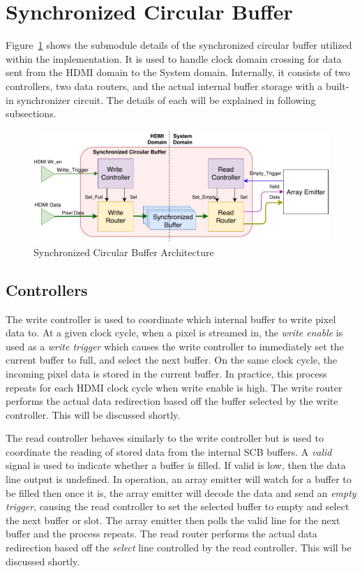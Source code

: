 \section{Synchronized Circular Buffer}

    Figure~\ref{fig:scb_arch} shows the submodule details of the synchronized circular buffer utilized within the implementation. It is used to handle clock domain crossing for data sent from the HDMI domain to the System domain. Internally, it consists of two controllers, two data routers, and the actual internal buffer storage with a built-in synchronizer circuit. The details of each will be explained in following subsections.

    \begin{figure}
        \centering
        \includegraphics[width=1.0\textwidth]{fig/pdp_scb_arch.pdf}
        \caption{Synchronized Circular Buffer Architecture}
        \label{fig:scb_arch}
    \end{figure}

    \subsection{Controllers}
        The write controller is used to coordinate which internal buffer to write pixel data to. At a given clock cycle, when a pixel is streamed in, the {\it write enable} is used as a {\it write trigger} which causes the write controller to immediately set the current buffer to full, and select the next buffer. On the same clock cycle, the incoming pixel data is stored in the current buffer. In practice, this process repeats for each HDMI clock cycle when write enable is high. The write router performs the actual data redirection based off the buffer selected by the write controller. This will be discussed shortly.

        The read controller behaves similarly to the write controller but is used to coordinate the reading of stored data from the internal SCB buffers. A {\it valid} signal is used to indicate whether a buffer is filled. If valid is low, then the data line output is undefined. In operation, an array emitter will watch for a buffer to be filled then once it is, the array emitter will decode the data and send an {\it empty trigger}, causing the read controller to set the selected buffer to empty and select the next buffer or slot. The array emitter then polls the valid line for the next buffer and the process repeats. The read router performs the actual data redirection based off the {\it select} line controlled by the read controller. This will be discussed shortly.

